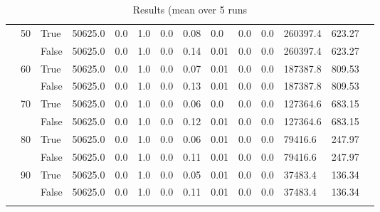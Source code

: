 \begin{landscape}
\begin{small}
\begin{longtable}[c]{@{}lll|ll|ll|ll|ll|lll@{}}
   & 50 & True  & 50625.0         & 0.0            & 1.0           & 0.0           & 0.08          & 0.0           & 0.0           & 0.0           & 260397.4      & 623.27      &  \\
   &    & False & 50625.0         & 0.0            & 1.0           & 0.0           & 0.14          & 0.01          & 0.0           & 0.0           & 260397.4      & 623.27      &  \\
   & 60 & True  & 50625.0         & 0.0            & 1.0           & 0.0           & 0.07          & 0.01          & 0.0           & 0.0           & 187387.8      & 809.53      &  \\
   &    & False & 50625.0         & 0.0            & 1.0           & 0.0           & 0.13          & 0.01          & 0.0           & 0.0           & 187387.8      & 809.53      &  \\
   & 70 & True  & 50625.0         & 0.0            & 1.0           & 0.0           & 0.06          & 0.0           & 0.0           & 0.0           & 127364.6      & 683.15      &  \\
   &    & False & 50625.0         & 0.0            & 1.0           & 0.0           & 0.12          & 0.01          & 0.0           & 0.0           & 127364.6      & 683.15      &  \\
   & 80 & True  & 50625.0         & 0.0            & 1.0           & 0.0           & 0.06          & 0.01          & 0.0           & 0.0           & 79416.6       & 247.97      &  \\
   &    & False & 50625.0         & 0.0            & 1.0           & 0.0           & 0.11          & 0.01          & 0.0           & 0.0           & 79416.6       & 247.97      &  \\
   & 90 & True  & 50625.0         & 0.0            & 1.0           & 0.0           & 0.05          & 0.01          & 0.0           & 0.0           & 37483.4       & 136.34      &  \\
   &    & False & 50625.0         & 0.0            & 1.0           & 0.0           & 0.11          & 0.01          & 0.0           & 0.0           & 37483.4       & 136.34      &  \\* \bottomrule
\caption{Results (mean over 5 runs}
\label{lab_res}\\
\end{longtable}
\end{small}
\end{landscape}
